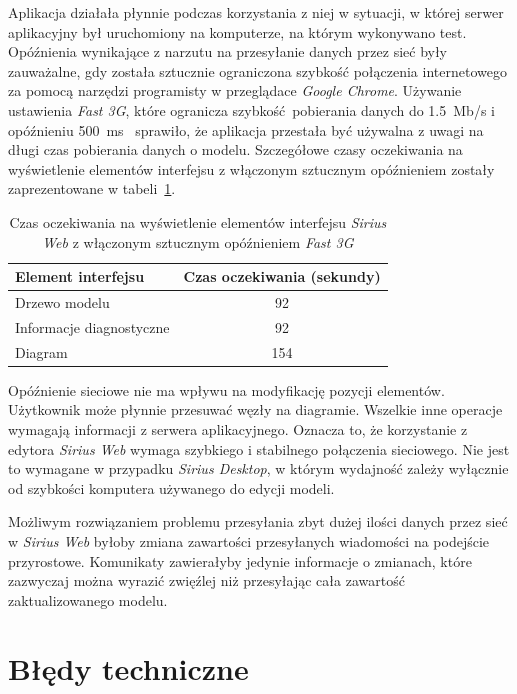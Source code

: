 Aplikacja działała płynnie podczas korzystania z niej w sytuacji, w której
serwer aplikacyjny był uruchomiony na komputerze, na którym wykonywano test.
Opóźnienia wynikające z narzutu na przesyłanie danych przez sieć były
zauważalne, gdy została sztucznie ograniczona szybkość połączenia internetowego
za pomocą narzędzi programisty w przeglądace \emph{Google Chrome}.
Używanie ustawienia \emph{Fast 3G}, które ogranicza szybkość pobierania danych
do 1.5~Mb/s i opóźnieniu
500~ms~\cite{network-throttling-profiles-stackoverflow} sprawiło, że aplikacja
przestała być używalna z uwagi na długi czas pobierania danych o modelu.
Szczegółowe czasy oczekiwania na wyświetlenie elementów interfejsu z włączonym
sztucznym opóźnieniem zostały zaprezentowane w
tabeli~\ref{tab:sirius-web-ui-delay-throttled}.

\begin{table}[!b]
	\centering
	\begin{tabular}{p{5cm}c}
		\toprule
		Element interfejsu       & Czas oczekiwania (sekundy) \\
		\midrule
		Drzewo modelu            & 92                         \\
		Informacje diagnostyczne & 92                         \\
		Diagram                  & 154                        \\
		\bottomrule
	\end{tabular}
	\caption{Czas oczekiwania na wyświetlenie elementów interfejsu
		\emph{Sirius
			Web} z włączonym sztucznym opóźnieniem \emph{Fast
			3G}}\label{tab:sirius-web-ui-delay-throttled}
\end{table}

Opóźnienie sieciowe nie ma wpływu na modyfikację pozycji elementów. Użytkownik
może płynnie przesuwać węzły na diagramie. Wszelkie inne operacje wymagają
informacji z serwera aplikacyjnego. Oznacza to, że korzystanie z edytora
\emph{Sirius Web} wymaga szybkiego i stabilnego połączenia sieciowego. Nie jest
to wymagane w przypadku \emph{Sirius Desktop}, w którym wydajność zależy
wyłącznie od szybkości komputera używanego do edycji modeli.

Możliwym rozwiązaniem problemu przesyłania zbyt dużej ilości danych przez sieć
w \emph{Sirius Web} byłoby zmiana zawartości przesyłanych wiadomości na
podejście przyrostowe. Komunikaty zawierałyby jedynie informacje o zmianach,
które zazwyczaj można wyrazić zwięźlej niż przesyłając cała zawartość
zaktualizowanego modelu.

\section{Błędy techniczne}

